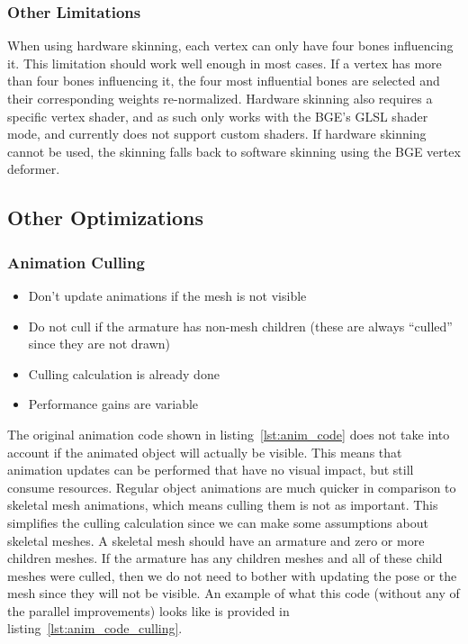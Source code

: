 \subsubsection{Other Limitations}

When using hardware skinning, each vertex can only have four bones influencing it. This limitation should work well enough in most cases. If a vertex has more than four bones influencing it, the four most influential bones are selected and their corresponding weights re-normalized. Hardware skinning also requires a specific vertex shader, and as such only works with the BGE's GLSL shader mode, and currently does not support custom shaders. If hardware skinning cannot be used, the skinning falls back to software skinning using the BGE vertex deformer.


\subsection{Other Optimizations}
\subsubsection{Animation Culling}
\begin{itemize}
 \item Don't update animations if the mesh is not visible
 \item Do not cull if the armature has non-mesh children (these are always ``culled'' since they are not drawn)
 \item Culling calculation is already done
 \item Performance gains are variable
\end{itemize}
The original animation code shown in listing~\ref{lst:anim_code} does not take into account if the animated object will actually be visible. This means that animation updates can be performed that have no visual impact, but still consume resources. Regular object animations are much quicker in comparison to skeletal mesh animations, which means culling them is not as important. This simplifies the culling calculation since we can make some assumptions about skeletal meshes. A skeletal mesh should have an armature and zero or more children meshes. If the armature has any children meshes and all of these child meshes were culled, then we do not need to bother with updating the pose or the mesh since they will not be visible. An example of what this code (without any of the parallel improvements) looks like is provided in listing~\ref{lst:anim_code_culling}.


